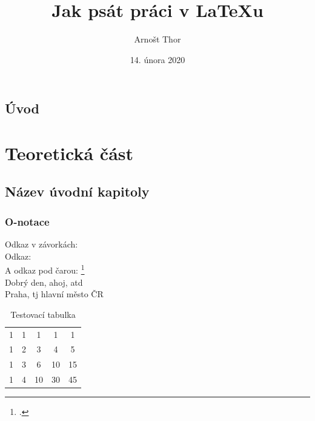 \documentclass[12pt]{report}			%
\author{Arnošt Thor}
\title{Jak psát práci v \LaTeX{}u}
\date{14. února 2020}
\begin{document}
	\mytitlepage						%
	
	
	\abstrakt{
		\lipsum[1]						%
	}{
		\lipsum[1]						%
	}
	
	\podekovani{
		\lipsum[2]						%
	}
	
   {\tableofcontents\newpage}			%
	
\addtocounter{page}{1}		%
	\chapter*{Úvod}
	
		\lipsum[1]	
	
	
	\part{Teoretická část}
	
		\chapter{Název úvodní kapitoly}
			
			\section{O-notace}
				Odkaz v závorkách: \parencite[see][page 900]{einstein}\\
				Odkaz: \cite{knuthwebsite}\\
				A odkaz pod čarou: \footcite[see][s. 42]{latexcompanion}\\
				Dobrý den, ahoj, \gls{atd}\\
				Praha, \gls{tj} hlavní město ČR
				
				\begin{table}
				  \caption{Testovací tabulka}
				  \label{tab:test2}
				  \begin{tabular}{ccccc}
                  1 & 1 & 1  & 1  & 1  \\
                  1 & 2 & 3  & 4  & 5  \\
                  1 & 3 & 6  & 10 & 15 \\
				  1 & 4 & 10 & 30 & 45
				  \end{tabular}
				\end{table}
\end{document}
